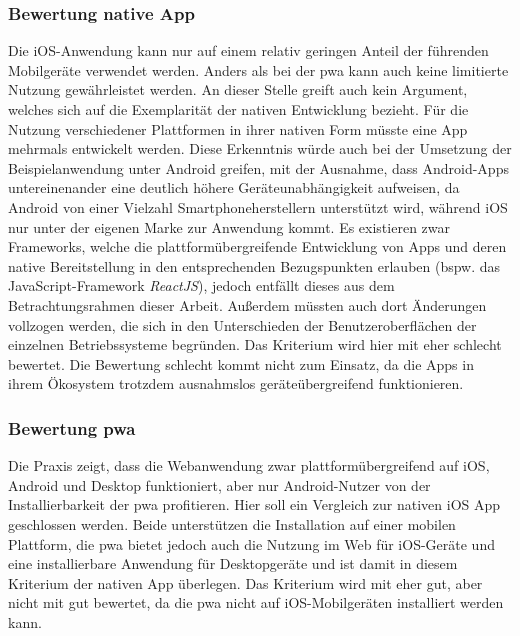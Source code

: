 \subsubsection{Bewertung native App}
Die iOS-Anwendung kann nur auf einem relativ geringen Anteil der führenden Mobilgeräte verwendet werden. Anders als bei der \ac{pwa} kann auch keine limitierte Nutzung gewährleistet werden. An dieser Stelle greift auch kein Argument, welches sich auf die Exemplarität der nativen Entwicklung bezieht. Für die Nutzung verschiedener Plattformen in ihrer nativen Form müsste eine App mehrmals entwickelt werden. Diese Erkenntnis würde auch bei der Umsetzung der Beispielanwendung unter Android greifen, mit der Ausnahme, dass Android-Apps untereinenander eine deutlich höhere Geräteunabhängigkeit aufweisen, da Android von einer Vielzahl Smartphoneherstellern unterstützt wird, während iOS nur unter der eigenen Marke zur Anwendung kommt. Es existieren zwar Frameworks, welche die plattformübergreifende Entwicklung von Apps und deren native Bereitstellung in den entsprechenden Bezugspunkten erlauben (bspw. das JavaScript-Framework \textit{ReactJS}), jedoch entfällt dieses aus dem Betrachtungsrahmen dieser Arbeit. Außerdem müssten auch dort Änderungen vollzogen werden, die sich in den Unterschieden der Benutzeroberflächen der einzelnen Betriebssysteme begründen. Das Kriterium wird hier mit eher schlecht bewertet. Die Bewertung schlecht kommt nicht zum Einsatz, da die Apps in ihrem Ökosystem trotzdem ausnahmslos geräteübergreifend funktionieren.

\subsubsection{Bewertung \ac{pwa}}
Die Praxis zeigt, dass die Webanwendung zwar plattformübergreifend auf iOS, Android und Desktop funktioniert, aber nur Android-Nutzer von der Installierbarkeit der \ac{pwa} profitieren.
Hier soll ein Vergleich zur nativen iOS App geschlossen werden. Beide unterstützen die Installation auf einer mobilen Plattform, die \ac{pwa} bietet jedoch auch die Nutzung im Web für iOS-Geräte und eine installierbare Anwendung für Desktopgeräte und ist damit in diesem Kriterium der nativen App überlegen. Das Kriterium wird mit eher gut, aber nicht mit gut bewertet, da die \ac{pwa} nicht auf iOS-Mobilgeräten installiert werden kann.